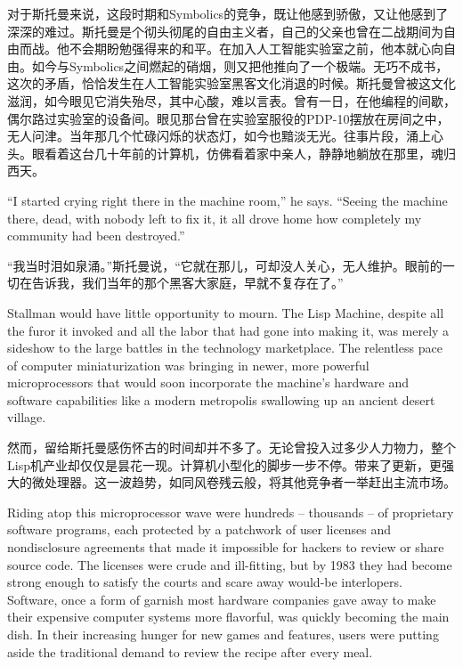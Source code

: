 \ifdefined\chs
对于斯托曼来说，这段时期和Symbolics的竞争，既让他感到骄傲，又让他感到了深深的难过。斯托曼是个彻头彻尾的自由主义者，自己的父亲也曾在二战期间为自由而战。他不会期盼勉强得来的和平。在加入人工智能实验室之前，他本就心向自由。如今与Symbolics之间燃起的硝烟，则又把他推向了一个极端。无巧不成书，这次的矛盾，恰恰发生在人工智能实验室黑客文化消退的时候。斯托曼曾被这文化滋润，如今眼见它消失殆尽，其中心酸，难以言表。曾有一日，在他编程的间歇，偶尔路过实验室的设备间。眼见那台曾在实验室服役的PDP-10摆放在房间之中，无人问津。当年那几个忙碌闪烁的状态灯，如今也黯淡无光。往事片段，涌上心头。眼看着这台几十年前的计算机，仿佛看着家中亲人，静静地躺放在那里，魂归西天。
\fi

\ifdefined\eng
``I started crying right there in the machine room,'' he says. ``Seeing the machine there, dead, with nobody left to fix it, it all drove home how completely my community had been destroyed.''
\fi

\ifdefined\chs
``我当时泪如泉涌。''斯托曼说，``它就在那儿，可却没人关心，无人维护。眼前的一切在告诉我，我们当年的那个黑客大家庭，早就不复存在了。''
\fi

\ifdefined\eng
Stallman would have little opportunity to mourn. The Lisp Machine, despite all the furor it invoked and all the labor that had gone into making it, was merely a sideshow to the large battles in the technology marketplace. The relentless pace of computer miniaturization was bringing in newer, more powerful microprocessors that would soon incorporate the machine's hardware and software capabilities like a modern metropolis swallowing up an ancient desert village.
\fi

\ifdefined\chs
然而，留给斯托曼感伤怀古的时间却并不多了。无论曾投入过多少人力物力，整个Lisp机产业却仅仅是昙花一现。计算机小型化的脚步一步不停。带来了更新，更强大的微处理器。这一波趋势，如同风卷残云般，将其他竞争者一举赶出主流市场。
\fi

\ifdefined\eng
Riding atop this microprocessor wave were hundreds -- thousands -- of proprietary software programs, each protected by a patchwork of user licenses and nondisclosure agreements that made it impossible for hackers to review or share source code. The licenses were crude and ill-fitting, but by 1983 they had become strong enough to satisfy the courts and scare away would-be interlopers. Software, once a form of garnish most hardware companies gave away to make their expensive computer systems more flavorful, was quickly becoming the main dish. In their increasing hunger for new games and features, users were putting aside the traditional demand to review the recipe after every meal.
\fi

